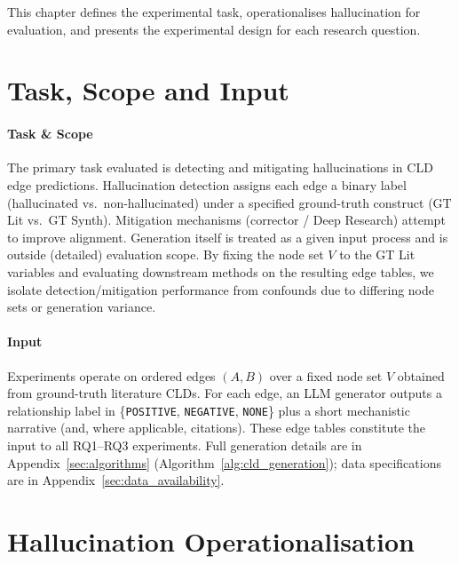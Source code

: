 This chapter defines the experimental task, operationalises hallucination for evaluation, and presents the experimental design for each research question.

\section{Task, Scope and Input}
\label{sec:task_definition}
\label{sec:problem_setup} %
\label{sec:task_cld_hallucination_detection}
\label{sec:task_cld_generation}

\paragraph{Task \& Scope}
The primary task evaluated is detecting and mitigating hallucinations in CLD edge predictions. Hallucination detection assigns each edge a binary label (hallucinated vs.\ non-hallucinated) under a specified ground-truth construct (GT Lit vs.\ GT Synth). Mitigation mechanisms (corrector / Deep Research) attempt to improve alignment. Generation itself is treated as a given input process and is outside (detailed) evaluation scope. By fixing the node set \(V\) to the GT Lit variables and evaluating downstream methods on the resulting edge tables, we isolate detection/mitigation performance from confounds due to differing node sets or generation variance.

\paragraph{Input}
Experiments operate on ordered edges \((A,B)\) over a fixed node set \(V\) obtained from ground-truth literature CLDs. For each edge, an LLM generator outputs a relationship label in \{\texttt{POSITIVE}, \texttt{NEGATIVE}, \texttt{NONE}\} plus a short mechanistic narrative (and, where applicable, citations). These edge tables constitute the input to all RQ1--RQ3 experiments. Full generation details are in Appendix~\ref{sec:algorithms} (Algorithm~\ref{alg:cld_generation}); data specifications are in Appendix~\ref{sec:data_availability}.

\section{Hallucination Operationalisation}
\label{sec:hallucination_operationalisation}
\label{sec:hallucination_definition} %

